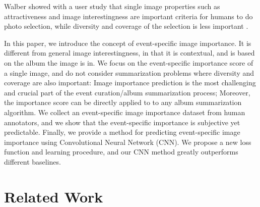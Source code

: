 \documentclass[10pt,twocolumn,letterpaper]{article}
\begin{document}
Walber \etal showed with a user study that single image properties such as attractiveness and image interestingness are important criteria for humans to do photo selection, while diversity and coverage of the selection is less important \cite{gaze}. 

In this paper, we introduce the concept of event-specific image importance. It is different from general image interestingness, in that it is contextual, and is based on the album the image is in. We focus on the event-specific importance score of a single image, and do not consider summarization problems where diversity and coverage are also important: Image importance prediction is the most challenging and crucial part of the event curation/album summarization process; Moreover, the importance score can be directly applied to to any album summarization algorithm. We collect an event-specific image importance dataset from human annotators, and we show that the event-specific importance is subjective yet predictable. Finally, we provide a method for predicting event-specific image importance using Convolutional Neural Network (CNN). We propose a new loss function and learning procedure, and our CNN method greatly outperforms different baselines.

\section{Related Work}
\end{document}
